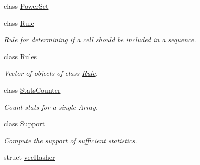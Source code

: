 \begin{DoxyCompactItemize}
class \hyperlink{classbarry_1_1_power_set}{Power\+Set}
\item 
class \hyperlink{classbarry_1_1_rule}{Rule}
\begin{DoxyCompactList}\small\item\em \hyperlink{classbarry_1_1_rule}{Rule} for determining if a cell should be included in a sequence. \end{DoxyCompactList}\item 
class \hyperlink{classbarry_1_1_rules}{Rules}
\begin{DoxyCompactList}\small\item\em Vector of objects of class \hyperlink{classbarry_1_1_rule}{Rule}. \end{DoxyCompactList}\item 
class \hyperlink{classbarry_1_1_stats_counter}{Stats\+Counter}
\begin{DoxyCompactList}\small\item\em Count stats for a single Array. \end{DoxyCompactList}\item 
class \hyperlink{classbarry_1_1_support}{Support}
\begin{DoxyCompactList}\small\item\em Compute the support of sufficient statistics. \end{DoxyCompactList}\item 
struct \hyperlink{structbarry_1_1vec_hasher}{vec\+Hasher}
\end{DoxyCompactItemize}
